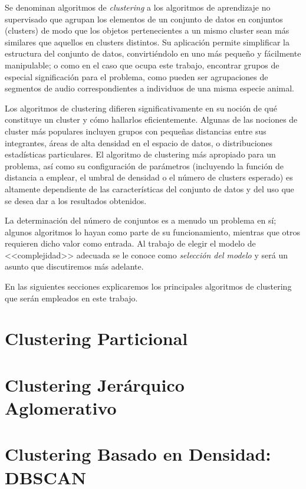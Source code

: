 Se denominan algoritmos de \textit{clustering} a los algoritmos de aprendizaje no supervisado que agrupan los elementos de un conjunto de datos en conjuntos (clusters) de modo que los objetos pertenecientes a un mismo cluster sean más similares que aquellos en clusters distintos.
Su aplicación permite simplificar la estructura del conjunto de datos, convirtiéndolo en uno más pequeño y fácilmente manipulable;
o como en el caso que ocupa este trabajo, encontrar grupos de especial significación para el problema, como pueden ser agrupaciones de segmentos de audio correspondientes a individuos de una misma especie animal.

Los algoritmos de clustering difieren significativamente en su noción de qué constituye un cluster y cómo hallarlos eficientemente.
Algunas de las nociones de cluster más populares incluyen grupos con pequeñas distancias entre sus integrantes, áreas de alta densidad en el espacio de datos, o distribuciones estadísticas particulares.
El algoritmo de clustering más apropiado para un problema, así como su configuración de parámetros (incluyendo la función de distancia a emplear, el umbral de densidad o el número de clusters esperado) es altamente dependiente de las características del conjunto de datos y del uso que se desea dar a los resultados obtenidos.

La determinación del número de conjuntos es a menudo un problema en sí;
algunos algoritmos lo hayan como parte de su funcionamiento, mientras que otros requieren dicho valor como entrada.
Al trabajo de elegir el modelo de <<complejidad>> adecuada se le conoce como \textit{selección del modelo} y será un asunto que discutiremos más adelante. %

En las siguientes secciones explicaremos los principales algoritmos de clustering que serán empleados en este trabajo.

\section{Clustering Particional}\label{sec:clusteringParticional}


\section{Clustering Jerárquico Aglomerativo}\label{sec:clusteringJerárquicoAglomerativo}


\section{Clustering Basado en Densidad: DBSCAN}\label{sec:Dbscan}

